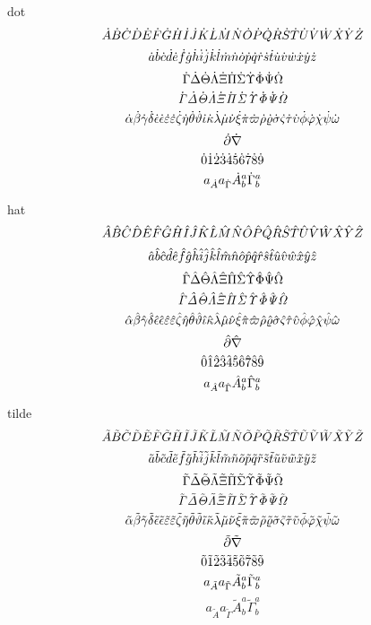 \documentclass{article}
\begin{document}
dot
\[ \Ad \Bd \Cd \Dd \Ed \Fd \Gd \Hd \Idot \Jd \Kd \Ld \Md \Nd \Od \Pd \Qd \Rd \Sd \Td \Ud \Vd \Wd \Xd \Yd \Zd \]
\[ \aad \bbd \ccd \ddd \eed \ffd \ggd \hhd \iid \jjd \kkd \lld \mmd \nnd \ood \ppd \qqd \rrd \ssd \ttd \uud \vvd \wwd \xxd \yyd \zzd \]
\[ \Gammad \Deltad \Thetad \Lambdad \Xid \Pid \Sigmad \Upsilond \Phid \Psid \Omegad \]
\[ \itGammad \itDeltad \itThetad \itLambdad \itXid \itPid \itSigmad \itUpsilond \itPhid \itPsid \itOmegad \]
\[ \alphad \betad \gammad \deltad \epsilond \epsd \varepsilond \vepsd \zetad \etad \thetad \varthetad \iotad \kappad \lambdad \mud \nud \xid \pid \varpid \rhod \varrhod \sigmad \varsigmad \taud \upsilond \phid \varphid \chid \psid \omegad \]
\[ \partiald \nablad \]
\[ \zrod \oned \twod \thrd \ford \fivd \sixd \sevd \eitd \nind \]
\[ a_{\Ad} a_{\Gammad} \Ad^a_b \Gammad^a_b \]

hat
\[ \Ah \Bh \Ch \Dh \Eh \Fh \Gh \Hh \Ih \Jh \Kh \Lh \Mh \Nh \Oh \Ph \Qh \Rh \Sh \Th \Uh \Vh \Wh \Xh \Yh \Zh \]
\[ \aah \bbh \cch \ddh \eeh \ffh \ggh \hhh \iih \jjh \kkh \llh \mmh \nnh \ooh \pph \qqh \rrh \ssh \tth \uuh \vvh \wwh \xxh \yyh \zzh \]
\[ \Gammah \Deltah \Thetah \Lambdah \Xih \Pih \Sigmah \Upsilonh \Phih \Psih \Omegah \]
\[ \itGammah \itDeltah \itThetah \itLambdah \itXih \itPih \itSigmah \itUpsilonh \itPhih \itPsih \itOmegah \]
\[ \alphah \betah \gammah \deltah \epsilonh \epsh \varepsilonh \vepsh \zetah \etah \thetah \varthetah \iotah \kappah \lambdah \muh \nuh \xih \pih \varpih \rhoh \varrhoh \sigmah \varsigmah \tauh \upsilonh \phih \varphih \chih \psih \omegah \]
\[ \partialh \nablah \]
\[ \zroh \oneh \twoh \thrh \forh \fivh \sixh \sevh \eith \ninh \]
\[ a_{\Ah} a_{\Gammah} \Ah^a_b \Gammah^a_b \]

tilde
\[ \At \Bt \Ct \Dt \Et \Ft \Gt \Ht \It \Jt \Kt \Lt \Mt \Nt \Ot \Pt \Qt \Rt \St \Tt \Ut \Vt \Wt \Xt \Yt \Zt \]
\[ \aat \bbt \cct \ddt \eet \fft \ggt \hht \iit \jjt \kkt \llt \mmt \nnt \oot \ppt \qqt \rrt \sst \ttt \uut \vvt \wwt \xxt \yyt \zzt \]
\[ \Gammat \Deltat \Thetat \Lambdat \Xit \Pit \Sigmat \Upsilont \Phit \Psit \Omegat \]
\[ \itGammat \itDeltat \itThetat \itLambdat \itXit \itPit \itSigmat \itUpsilont \itPhit \itPsit \itOmegat \]
\[ \alphat \betat \gammat \deltat \epsilont \epst \varepsilont \vepst \zetat \etat \thetat \varthetat \iotat \kappat \lambdat \mut \nut \xit \pit \varpit \rhot \varrhot \sigmat \varsigmat \taut \upsilont \phit \varphit \chit \psit \omegat \]
\[ \partialt \nablat \]
\[ \zrot \onet \twot \thrt \fort \fivt \sixt \sevt \eitt \nint \]
\[ a_{\At} a_{\Gammat} \At^a_b \Gammat^a_b \]
\[ a_{\tilde A} a_{\tilde \Gamma} \tilde{A}^a_b \tilde{\Gamma}^a_b \]
\end{document}
